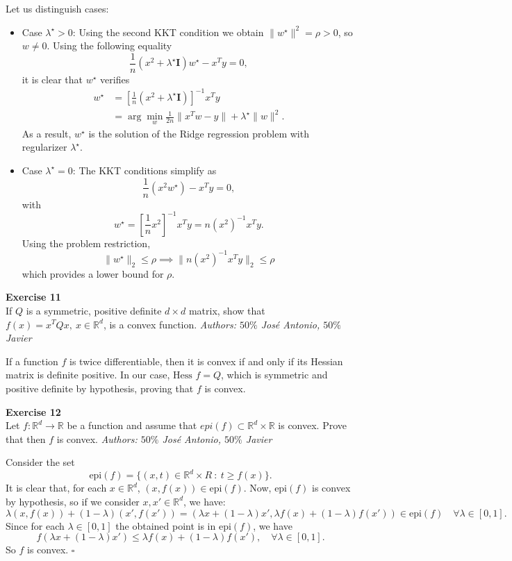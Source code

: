 \documentclass[11pt,table]{article}
\newcommand{\qed}{\hfill $\square$}
\newenvironment{problem}[2][Exercise]
{ \begin{mdframed}[backgroundcolor=gray!20] \textbf{#1 #2} \\}
	{\hspace{0.0cm}\newline\newline \emph{Authors: \(50\%\) José Antonio, \(50\%\) Javier}  \end{mdframed}}
\newcommand\R{\mathbb R}
\begin{document}
	Let us distinguish cases:
	
	\begin{itemize}
		\item Case $\lambda^\star > 0$: Using the second KKT condition we obtain \(\|w^\star\|^2 = \rho > 0\), so \(w \neq 0\).
		Using the following equality
		\[
		\frac{1}{n} (x^2 + \lambda^\star \bm{I})w^\star - x^Ty = 0,
		\]
		it is clear that \(w^\star\) verifies
		\[\begin{aligned}
			w^\star & = \left[ \frac{1}{n} (x^2 + \lambda^\star \bm{I})\right]^{-1}x^T y     \\
			& = \arg \min_{w} \frac{1}{2n} \|x^T w - y\| + \lambda^\star \|w\|^2.
		\end{aligned}\]
		As a result, \(w^\star\) is the solution of the Ridge regression problem with regularizer \(\lambda^\star\).
		\item Case \(\lambda^\star = 0\): The KKT conditions simplify as
		\[
		\frac{1}{n} \left(x^2w^\star\right) - x^Ty = 0,
		\]
		with
		\[
		w^\star = \left[ \frac{1}{n} x^2\right]^{-1}x^T y = n(x^2)^{-1} x^Ty.
		\]
		Using the problem restriction,
		\[
		\|w^\star\|_2 \leq \rho \implies \| n(x^2)^{-1} x^T y\|_2 \leq \rho
		\]
		which provides a lower bound for $\rho$. \\
	\end{itemize}
	
	
	
	\begin{problem}{11}
		If \( Q \) is a symmetric, positive definite \( d \times d \) matrix, show that \( f(x) = x^TQx, \ x \in \mathbb{R}^d \), is a convex function.
	\end{problem}
	
	If a function $f$ is twice differentiable, then it is convex if and only if its Hessian matrix is definite positive. In our case, $\text{Hess }f = Q$, which is symmetric and positive definite by hypothesis, proving that $f$ is convex. \\
	
	\begin{problem}{12}
		Let \( f:\mathbb{R}^d \to \mathbb{R} \)  be a function and assume that \( epi(f) \subset \mathbb{R}^d \times \mathbb{R} \)  is convex. Prove that then \( f \)  is convex.
	\end{problem}
	
	Consider the set
	\[
	\text{epi}(f) = \{(x,t)\in \R^d \times R \ : \ t \geq f(x)\}.
	\]
	It is clear that, for each \(x \in \R^d\), \((x,f(x))\in \text{epi}(f)\). Now, \(\text{epi}(f)\) is convex by hypothesis, so if we consider \(x,x'\in \R^d\), we have:
	\[
	\lambda(x,f(x)) + (1-\lambda)(x',f(x')) = \left(\lambda x + (1-\lambda)x', \lambda f(x) + (1-\lambda)f(x')\right) \in \text{epi}(f)\quad \forall \lambda \in [0,1].
	\]
	Since for each \(\lambda \in [0,1]\) the obtained point is in \(\text{epi}(f)\), we have
	\[
	f(\lambda x + (1-\lambda)x') \leq \lambda f(x) + (1-\lambda)f(x'), \quad \forall \lambda \in [0,1].
	\]
	So \(f\) is convex. \qed \\
	
\end{document}
